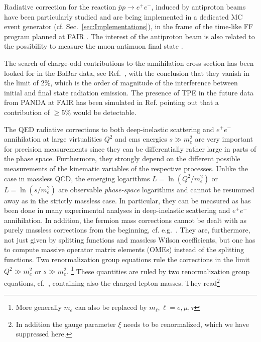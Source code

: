 Radiative correction for the reaction $\bar p p\to e^+e^- $, induced by antiproton beams  have been particularly studied \cite{Bystritskiy:2019iki} and are being implemented in a dedicated MC event generator (cf. Sec.~\ref{sec:Implementations}),  in the frame  of the time-like FF program planned at FAIR \cite{PANDA:2016fbp}. The interest of the antiproton beam  is also related to the possibility to measure the muon-antimuon final state \cite{PANDA:2020jkm}. 

The search of charge-odd contributions to the annihilation cross section has been looked for in the BaBar data, see Ref.~\cite{Tomasi-Gustafsson:2007vpn}, with the conclusion that they vanish in the limit of 2\%, which is the order of magnitude of the interference between initial and final state radiation emission. The presence of TPE in the future data from PANDA at FAIR has been simulated in Ref. \cite{PANDA:2016fbp} pointing out that a contribution of $\ge 5\% $ would be detectable. 


The QED radiative corrections to both deep-inelastic scattering and $e^+e^-$ annihilation at large virtualities
$Q^2$ and cms energies $s \gg m_e^2$ are very important for precision measurements 
since they can be 
differentially rather large in parts of the phase space. Furthermore, they strongly depend on the different 
possible measurements of the kinematic variables of the respective processes. Unlike the case in massless QCD,
the emerging logarithms $L = \ln(Q^2/m_e^2)$ or $L =\ln(s/m_e^2)$ are observable {\it phase-space} logarithms and 
cannot be resummed away as in the strictly massless case. In particular, they can be measured as has been done
in many experimental analyses in deep-inelastic scattering and $e^+e^-$ annihilation. In addition, the fermion 
mass corrections cannot be dealt with as purely massless corrections from the beginning, cf. 
e.g.~\cite{Blumlein:2020jrf}. They are, furthermore, not just given by splitting functions and massless Wilson 
coefficients, but one has to compute massive operator matrix elements (OMEs) instead of the splitting functions. 
Two 
renormalization group equations rule the corrections in the limit $Q^2 \gg m_e^2$ or $s \gg m_e^2$. \footnote{More 
generally $m_e$ can also be replaced by $m_\ell, \ell = e, \mu, \tau$} These quantities are ruled by two 
renormalization group equations, cf.~\cite{Blumlein:2000wh,Blumlein:2011mi,MUTA}, containing also the charged 
lepton masses. They read\footnote{In addition the gauge parameter $\xi$ needs to be renormalized, which we have 
suppressed here.}

